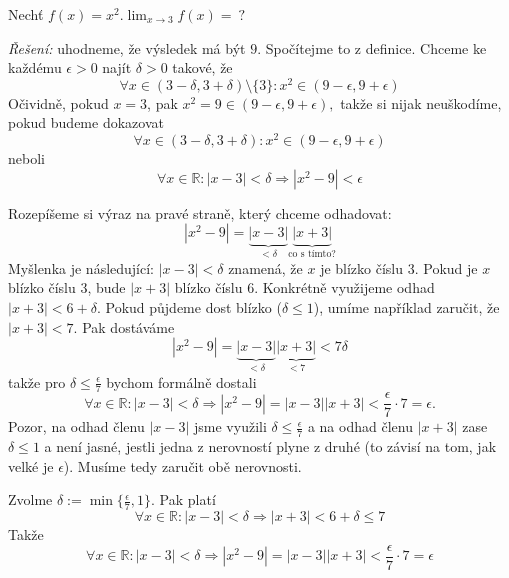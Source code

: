 \begin{příklad}\label{pr:x^2 v bode 3}
	Nechť $f(x)=x^{2}. \lim_{x\to 3}f(x)=\ ?$\par
	\textit{Řešení:} uhodneme, že výsledek má být $9.$ Spočítejme to z definice. Chceme ke každému $\epsilon>0$ najít $\delta>0$ takové, že
\begin{equation*}
	\forall x\in (3-\delta,3+\delta)\setminus\{3\}\colon x^{2}\in (9-\epsilon,9+\epsilon)
\end{equation*}
Očividně, pokud $x=3$, pak $x^{2}=9\in (9-\epsilon,9+\epsilon),$ takže si nijak neuškodíme, pokud budeme dokazovat
\begin{equation*}
	\forall x\in (3-\delta,3+\delta)\colon x^{2}\in (9-\epsilon,9+\epsilon)
\end{equation*}
neboli
\begin{equation*}
	\forall x\in \mathbb{R}\colon |x-3|<\delta \Rightarrow |x^{2}-9|<\epsilon
\end{equation*}
\begin{jak vymyslet důkaz}
Rozepíšeme si výraz na pravé straně, který chceme odhadovat:
\begin{equation*}
	|x^{2}-9|=\underbrace{|x-3|}_{<\delta}\underbrace{|x+3|}_{\text{co s tímto?}}
\end{equation*}
Myšlenka je následující: $|x-3|<\delta$ znamená, že $x$ je blízko číslu 3. Pokud je $x$ blízko číslu $3$, bude $|x+3|$ blízko číslu 6. Konkrétně využijeme odhad $|x+3|<6+\delta.$ Pokud půjdeme dost blízko ($\delta\leq 1$), umíme například zaručit, že $|x+3|<7.$ Pak dostáváme
\begin{equation*}
	|x^{2}-9|=\underbrace{|x-3|}_{<\delta}\underbrace{|x+3|}_{<7}<7\delta
\end{equation*}
takže pro $\delta \leq \frac{\epsilon}{7}$ bychom formálně dostali
\begin{equation*}
  \forall x\in \mathbb{R}\colon |x-3|<\delta \Rightarrow |x^{2}-9|=|x-3||x+3|<\frac{\epsilon}{7}\cdot 7 = \epsilon.
\end{equation*}
Pozor, na odhad členu $|x-3|$ jsme využili $\delta\leq \frac{\epsilon}{7}$ a na odhad členu $|x+3|$ zase $\delta\leq 1$ a není jasné, jestli jedna z nerovností plyne z druhé (to závisí na tom, jak velké je $\epsilon$). Musíme tedy zaručit obě nerovnosti.
\end{jak vymyslet důkaz}
\begin{důkaz}
	Zvolme $\delta:=\min\{\frac{\epsilon}{7},1\}.$ Pak platí
\begin{equation*}
  \forall x\in \mathbb{R}\colon |x-3|<\delta \Rightarrow |x+3|<6+\delta\leq 7
\end{equation*}
Takže
\begin{equation*}
  \forall x\in \mathbb{R}\colon |x-3|<\delta \Rightarrow |x^{2}-9|=|x-3||x+3|<\frac{\epsilon}{7}\cdot 7 = \epsilon
\end{equation*}
\end{důkaz}
\end{příklad}
